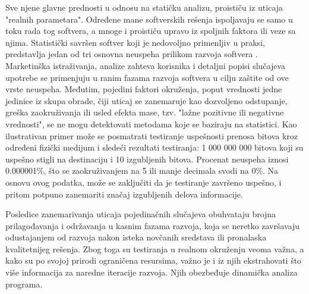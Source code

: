 \documentclass[12pt,oneside]{memoir}
\begin{document}
Sve njene glavne prednosti u odnosu na statičku analizu, proističu iz uticaja "realnih parametara". Određene mane softverskih rešenja ispoljavaju se samo u toku rada tog softvera, a mnoge i proističu upravo iz spoljnih faktora ili veze sa njima. Statistički savršen softver koji je nedovoljno primenljiv u praksi, predstavlja jedan od tri osnovna neuspeha prilikom razvoja softvera \cite{Malkov}. Marketinška istraživanja, analize zahteva korisnika i detaljni popisi slučajeva upotrebe se primenjuju u ranim fazama razvoja softvera u cilju zaštite od ove vrste neuspeha. Međutim, pojedini faktori okruženja, poput vrednosti jedne jedinice iz skupa obrade, čiji uticaj se zanemaruje kao dozvoljeno odstupanje, greška zaokruživanja ili usled efekta mase, tzv. "lažne pozitivne ili negativne vrednosti", se ne mogu detektovati metodama koje se baziraju na statistici. Kao ilustrativan primer može se posmatrati testiranje uspešnosti prenosa bitova kroz određeni fizički medijum i sledeći rezultati testiranja: 1 000 000 000 bitova koji su uspešno stigli na destinaciju i 10 izgubljenih bitova. Procenat neuspeha iznosi 0.000001\%, što se zaokruživanjem na 5 ili manje decimala svodi na 0\%. Na osnovu ovog podatka, može se zaključiti da je testiranje završeno uspešno, i pritom potpuno zanemariti značaj izgubljenih delova informacije.

Posledice zanemarivanja uticaja pojedinačnih slučajeva obuhvataju brojna prilagođavanja i održavanja u kasnim fazama razvoja, koja se neretko završavaju odustajanjem od razvoja nakon isteka novčanih sredstava ili pronalaska kvalitetnijeg rešenja. Zbog toga su testiranja u realnom okruženju veoma važna, a kako su po svojoj prirodi ograničena resursima, važno je i iz njih ekstrahovati što više informacija za naredne iteracije razvoja. Njih obezbeđuje dinamička analiza programa.
\end{document}

